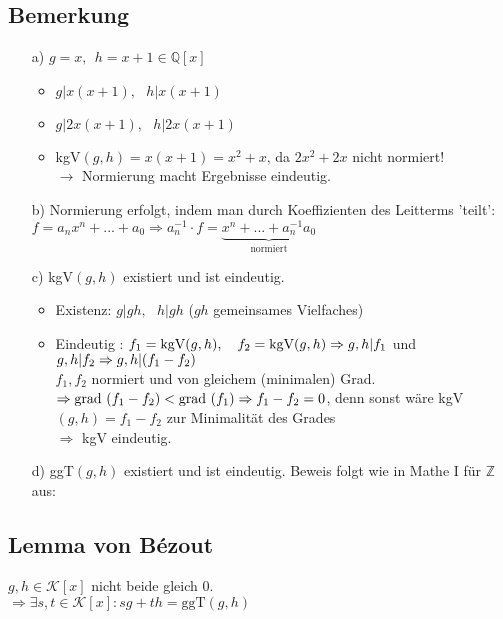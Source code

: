 \documentclass[12pt,titlepage, pdf]{article}
\newcommand{\K}{\mathcal{K}}
\renewcommand{\>}{\rightarrow}
\renewcommand{\*}{\cdot}
\begin{document}
	\subsection{Bemerkung}
	\label{4.30}
	\begin{itemize}
		\item[a)] $g = x,~~ h = x+1 \in \mathds{Q}[x]$
		\begin{itemize}
			\item $g \vert x(x+1),~~~ h \vert x(x+1)$
			\item $g \vert 2x(x+1), ~~~h \vert 2x(x+1)$
			\item kgV$(g,h) = x(x+1)  = x^2 + x$, da $2x^2 +2x$ nicht normiert!\\
			$\rightarrow$ Normierung macht Ergebnisse eindeutig. 
		\end{itemize}
		\item[b)] Normierung erfolgt, indem man durch Koeffizienten des Leitterms 'teilt': \\
		$f = a_n x^n + ... + a_0 \Rightarrow a_n^{-1} \cdot f = \underbrace{x^n + ... + a_n^{-1}a_0}_{\text{normiert}}$
		\item[c)] kgV$(g,h)$ existiert und ist eindeutig.
		\begin{itemize}
			\item Existenz: $g \vert gh,~~~ h \vert gh$ ($gh$ gemeinsames Vielfaches)
			\item Eindeutig : $f_1 = \text{kgV}(g,h), ~~~f_2 = \text{kgV}(g,h)\\
			\Rightarrow g,h \vert f_1$ und $g,h \vert f_2\\
			\Rightarrow g,h \vert (f_1 - f_2)$\\
			$f_1,f_2$ normiert und von gleichem (minimalen) Grad.\\
			$\Rightarrow \text{grad }(f_1- f_2) < \text{grad } (f_1) \\
			\Rightarrow f_1 - f_2 = 0$, denn sonst wäre kgV$(g,h) = f_1 - f_2$  \qquad \Lightning zur Minimalität des Grades\\
			$\Rightarrow$ kgV eindeutig.
		\end{itemize}
		\item[d)] ggT$(g,h)$ existiert und ist eindeutig. Beweis folgt wie in Mathe I für $\mathds{Z}$ aus:
	\end{itemize}
	\subsection{Lemma von Bézout}
	$g,h \in \K[x]$ nicht beide gleich 0.\\
	$\Rightarrow \exists s,t \in \K[x]: sg + th = \text{ggT}(g,h)$ \\
\end{document}
